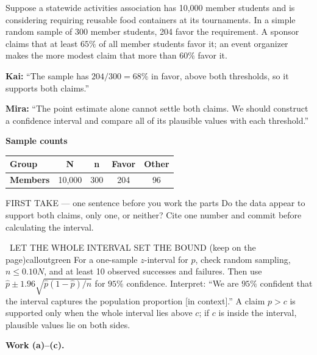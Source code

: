 \documentclass[11pt]{article}
\begin{document}


Suppose a statewide activities association has 10,000 member students and is considering requiring reusable food containers at its tournaments. In a simple random sample of 300 member students, 204 favor the requirement. A sponsor claims that at least $65\%$ of all member students favor it; an event organizer makes the more modest claim that more than $60\%$ favor it.\par\smallskip \textbf{Kai:} ``The sample has $204/300=68\%$ in favor, above both thresholds, so it supports both claims.''\par \textbf{Mira:} ``The point estimate alone cannot settle both claims. We should construct a confidence interval and compare all of its plausible values with each threshold.''\par
\begin{center}
\textbf{Sample counts}\par\smallskip
\begin{tabular}{|l|c|c|c|c|}
\hline
\textbf{Group} & \textbf{N} & \textbf{n} & \textbf{Favor} & \textbf{Other} \\ \hline
\textbf{Members} & 10,000 & 300 & 204 & 96 \\ \hline
\end{tabular}
\end{center}
\begin{firsttakebox}{FIRST TAKE --- one sentence before you work the parts}
Do the data appear to support both claims, only one, or neither? Cite one number and commit before calculating the interval.
\workspace{0.9in}
\end{firsttakebox}

\begin{callout}{\IconBook\ LET THE WHOLE INTERVAL SET THE BOUND (keep on the page)}{calloutgreen}
For a one-sample $z$-interval for $p$, check random sampling, $n\le0.10N$, and at least
10 observed successes and failures. Then use $\hat p\pm1.96\sqrt{\hat p(1-\hat p)/n}$
for $95\%$ confidence. Interpret: ``We are $95\%$ confident that the interval captures
the population proportion [in context].'' A claim $p>c$ is supported only when the whole
interval lies above $c$; if $c$ is inside the interval, plausible values lie on both sides.
\end{callout}

\newpage
\textbf{Work (a)--(c).}\par\smallskip
\end{document}
